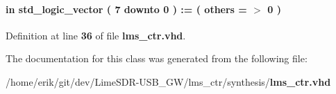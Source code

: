 \paragraph[{switch\+\_\+external\+\_\+connection\+\_\+export}]{ {\bfseries \textcolor{keywordflow}{in}\textcolor{vhdlchar}{ }} {\bfseries \textcolor{comment}{std\+\_\+logic\+\_\+vector}\textcolor{vhdlchar}{ }\textcolor{vhdlchar}{(}\textcolor{vhdlchar}{ }\textcolor{vhdlchar}{ } \textcolor{vhdldigit}{7} \textcolor{vhdlchar}{ }\textcolor{keywordflow}{downto}\textcolor{vhdlchar}{ }\textcolor{vhdlchar}{ } \textcolor{vhdldigit}{0} \textcolor{vhdlchar}{ }\textcolor{vhdlchar}{)}\textcolor{vhdlchar}{ }\textcolor{vhdlchar}{ }\textcolor{vhdlchar}{ }\textcolor{vhdlchar}{\+:}\textcolor{vhdlchar}{=}\textcolor{vhdlchar}{ }\textcolor{vhdlchar}{(}\textcolor{vhdlchar}{ }\textcolor{vhdlchar}{ }\textcolor{keywordflow}{others}\textcolor{vhdlchar}{ }\textcolor{vhdlchar}{ }\textcolor{vhdlchar}{=}\textcolor{vhdlchar}{ }\textcolor{vhdlchar}{$>$}\textcolor{vhdlchar}{ }\textcolor{vhdlchar}{\textquotesingle{}}\textcolor{vhdlchar}{ } \textcolor{vhdldigit}{0} \textcolor{vhdlchar}{ }\textcolor{vhdlchar}{\textquotesingle{}}\textcolor{vhdlchar}{ }\textcolor{vhdlchar}{)}\textcolor{vhdlchar}{ }} \hspace{0.3cm}{\ttfamily [Port]}}\label{classlms__ctr_a29981f802fdd59819f1ba2524dfeb69c}


Definition at line {\bf 36} of file {\bf lms\+\_\+ctr.\+vhd}.



The documentation for this class was generated from the following file\+:\begin{DoxyCompactItemize}
\item 
/home/erik/git/dev/\+Lime\+S\+D\+R-\/\+U\+S\+B\+\_\+\+G\+W/lms\+\_\+ctr/synthesis/{\bf lms\+\_\+ctr.\+vhd}\end{DoxyCompactItemize}
